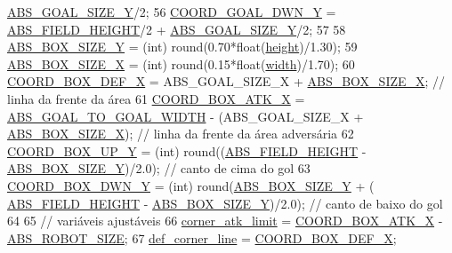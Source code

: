 \begin{DoxyCode}
      \hyperlink{namespace_c_o_n_s_t_a5461381c3d71d5f77ef87d4e8c2b05df}{ABS\_GOAL\_SIZE\_Y}/2;
56     \hyperlink{namespace_c_o_n_s_t_a97382a534273f1ca10b7cdf29fab9d0a}{COORD\_GOAL\_DWN\_Y} = \hyperlink{namespace_c_o_n_s_t_a42a76a781b7cd424616b37ec9d720f98}{ABS\_FIELD\_HEIGHT}/2 + 
      \hyperlink{namespace_c_o_n_s_t_a5461381c3d71d5f77ef87d4e8c2b05df}{ABS\_GOAL\_SIZE\_Y}/2;
57 
58     \hyperlink{namespace_c_o_n_s_t_a90910fad6734057eeb76ae1f44eadfd8}{ABS\_BOX\_SIZE\_Y} = (int) round(0.70*\textcolor{keywordtype}{float}(\hyperlink{namespace_c_o_n_s_t_a9805ca9eb67b8225c60697567283175d}{height})/1.30); 
59     \hyperlink{namespace_c_o_n_s_t_a181907129f9dadbae4c4f05af8bd5e8f}{ABS\_BOX\_SIZE\_X} = (int) round(0.15*\textcolor{keywordtype}{float}(\hyperlink{namespace_c_o_n_s_t_afd10469262c8cf9aec66ca799bfea24c}{width})/1.70); 
60     \hyperlink{namespace_c_o_n_s_t_a7d27201b3e7475f3c8141242fa75a026}{COORD\_BOX\_DEF\_X} = ABS\_GOAL\_SIZE\_X + \hyperlink{namespace_c_o_n_s_t_a181907129f9dadbae4c4f05af8bd5e8f}{ABS\_BOX\_SIZE\_X}; \textcolor{comment}{// linha da frente da
       área}
61     \hyperlink{namespace_c_o_n_s_t_a18d16256fcefad7961c73c9546127750}{COORD\_BOX\_ATK\_X} = \hyperlink{namespace_c_o_n_s_t_abe3ca2e589a94f9e273309abaa8313d4}{ABS\_GOAL\_TO\_GOAL\_WIDTH} - (ABS\_GOAL\_SIZE\_X + 
      \hyperlink{namespace_c_o_n_s_t_a181907129f9dadbae4c4f05af8bd5e8f}{ABS\_BOX\_SIZE\_X}); \textcolor{comment}{// linha da frente da área adversária}
62     \hyperlink{namespace_c_o_n_s_t_a5183cf5159cdc31e5b55d6d97d0854e4}{COORD\_BOX\_UP\_Y} = (int) round((\hyperlink{namespace_c_o_n_s_t_a42a76a781b7cd424616b37ec9d720f98}{ABS\_FIELD\_HEIGHT} - 
      \hyperlink{namespace_c_o_n_s_t_a90910fad6734057eeb76ae1f44eadfd8}{ABS\_BOX\_SIZE\_Y})/2.0); \textcolor{comment}{// canto de cima do gol}
63     \hyperlink{namespace_c_o_n_s_t_ae8aee80eeed2ae4a828ac666631db4d3}{COORD\_BOX\_DWN\_Y} = (int) round(\hyperlink{namespace_c_o_n_s_t_a90910fad6734057eeb76ae1f44eadfd8}{ABS\_BOX\_SIZE\_Y} + (
      \hyperlink{namespace_c_o_n_s_t_a42a76a781b7cd424616b37ec9d720f98}{ABS\_FIELD\_HEIGHT} - \hyperlink{namespace_c_o_n_s_t_a90910fad6734057eeb76ae1f44eadfd8}{ABS\_BOX\_SIZE\_Y})/2.0); \textcolor{comment}{// canto de baixo do gol}
64 
65     \textcolor{comment}{// variáveis ajustáveis}
66     \hyperlink{namespace_c_o_n_s_t_a2dae2bbcbbd0735ad1544509929d1c8f}{corner\_atk\_limit} = \hyperlink{namespace_c_o_n_s_t_a18d16256fcefad7961c73c9546127750}{COORD\_BOX\_ATK\_X} - 
      \hyperlink{namespace_c_o_n_s_t_a8d0d7fe4341b9129cabd565ef16a0640}{ABS\_ROBOT\_SIZE};
67     \hyperlink{namespace_c_o_n_s_t_a1ceb4c2871b41b2f17d5bff1e40e9dd0}{def\_corner\_line} = \hyperlink{namespace_c_o_n_s_t_a7d27201b3e7475f3c8141242fa75a026}{COORD\_BOX\_DEF\_X};

\end{DoxyCode}
